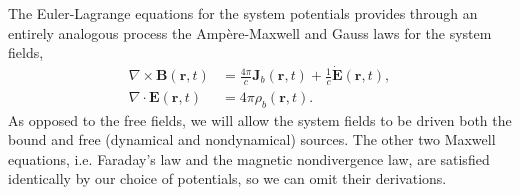 \documentclass{article}
\begin{document}
The Euler-Lagrange equations for the system potentials provides through an entirely analogous process the Amp\`{e}re-Maxwell and Gauss laws for the system fields,
\begin{equation}
\begin{split}
\nabla\times\mathbf{B}(\mathbf{r},t) &= \frac{4\pi}{c}\mathbf{J}_b(\mathbf{r},t) + \frac{1}{c}\dot{\mathbf{E}}(\mathbf{r},t),\\
\nabla\cdot\mathbf{E}(\mathbf{r},t) &= 4\pi\rho_b(\mathbf{r},t).
\end{split}
\end{equation}
As opposed to the free fields, we will allow the system fields to be driven both the bound and free (dynamical and nondynamical) sources. The other two Maxwell equations, i.e. Faraday's law and the magnetic nondivergence law, are satisfied identically by our choice of potentials, so we can omit their derivations. 
\end{document}
